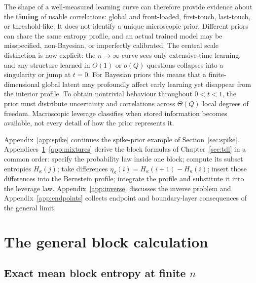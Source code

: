 The shape of a well-measured learning curve can therefore provide
evidence about the \textbf{timing} of usable correlations: global and
front-loaded, first-touch, last-touch, or threshold-like. It does not
identify a unique microscopic prior. Different priors can share the
same entropy profile, and an actual trained model may be
misspecified, non-Bayesian, or imperfectly calibrated. The central
scale distinction is now explicit: the $n\to\infty$ curve sees only
extensive-time learning, and any structure learned in $O(1)$ or
$o(Q)$ questions collapses into a singularity or jump at $t = 0$. For
Bayesian priors this means that a finite-dimensional global latent may
profoundly affect early learning yet disappear from the interior
profile. To obtain nontrivial behaviour throughout $0 < t < 1$, the
prior must distribute uncertainty and correlations across $\Theta(Q)$
local degrees of freedom. Macroscopic leverage classifies when stored
information becomes available, not every detail of how the prior
represents it.

\appendix

Appendix~\ref{app:spike} continues the spike-prior example of
Section~\ref{sec:spike}.
Appendices~\ref{app:block}--\ref{app:mixtures} derive the block
formulas of Chapter~\ref{sec:tdl} in a common order: specify the
probability law inside one block; compute its subset entropies
$H_\kappa(j)$; take differences
$\eta_\kappa(i) = H_\kappa(i+1)-H_\kappa(i)$; insert those
differences into the Bernstein profile; integrate the profile and
substitute it into the leverage law.
Appendix~\ref{app:inverse} discusses the inverse problem and
Appendix~\ref{app:endpoints} collects endpoint and boundary-layer
consequences of the general limit.


\section{The general block calculation}\label{app:block}

\subsection{Exact mean block entropy at finite \texorpdfstring{$n$}{n}}

